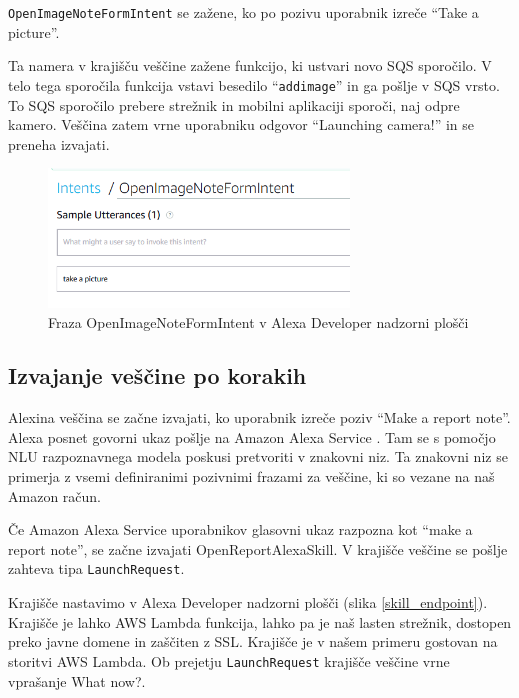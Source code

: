 \documentclass[a4paper, 12pt]{book}
\begin{document}
\texttt{OpenImageNoteFormIntent} se zažene, ko po pozivu uporabnik izreče \enquote{Take a picture}.

Ta namera v krajišču veščine zažene funkcijo, ki ustvari novo SQS sporočilo.
V telo tega sporočila funkcija vstavi besedilo \enquote{\texttt{addimage}} in ga pošlje v SQS vrsto.
To SQS sporočilo prebere strežnik in mobilni aplikaciji sporoči, naj odpre kamero.
Veščina zatem vrne uporabniku odgovor \enquote{Launching camera!} in se preneha izvajati.

\begin{figure}[H]
\begin{center}
\includegraphics[width=8cm]{intent_image}
\end{center}
\caption{Fraza OpenImageNoteFormIntent v Alexa Developer nadzorni plošči}
\label{OpenImageNoteFormIntent}
\end{figure}

\subsection{Izvajanje veščine po korakih}

Alexina veščina se začne izvajati, ko uporabnik izreče poziv \enquote{Make a report note}.
Alexa posnet govorni ukaz pošlje na Amazon Alexa Service \cite{skillexecution}.
Tam se s pomočjo NLU razpoznavnega modela poskusi pretvoriti v znakovni niz.
Ta znakovni niz se primerja z vsemi definiranimi pozivnimi frazami za veščine, ki so vezane na naš Amazon račun.

Če Amazon Alexa Service uporabnikov glasovni ukaz razpozna kot \enquote{make a report note}, se začne izvajati OpenReportAlexaSkill.
V krajišče veščine se pošlje zahteva tipa \texttt{LaunchRequest}.

Krajišče nastavimo v Alexa Developer nadzorni plošči (slika \ref{skill_endpoint}).
Krajišče je lahko AWS Lambda funkcija, lahko pa je naš lasten strežnik, dostopen preko javne domene in zaščiten z SSL.
Krajišče je v našem primeru gostovan na storitvi AWS Lambda.
Ob prejetju \texttt{LaunchRequest} krajišče veščine vrne vprašanje What now?.
\end{document}
